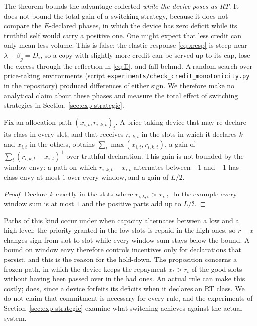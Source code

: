 The theorem bounds the advantage collected \emph{while the device poses as RT}.
It does not bound the total gain of a switching strategy, because it does not compare the $E$-declared phases, in which the device has zero deficit while its truthful self would carry a positive one.
One might expect that less credit can only mean less volume.
This is false: the elastic response \eqref{eq:xresp} is steep near $\lambda-\beta_g=D_i$, so a copy with slightly more credit can be served up to its cap, lose the excess through the reflection in \eqref{eq:D}, and fall behind.
A random search over price-taking environments (script \texttt{experiments/check\_credit\_monotonicity.py} in the repository) produced differences of either sign.
We therefore make no analytical claim about these phases and measure the total effect of switching strategies in Section~\ref{sec:exp-strategic}.

\begin{proposition}\label{prop:commit}
Fix an allocation path $(x_{i,t},r_{i,k,t})_t$.
A price-taking device that may re-declare its class in every slot, and that receives $r_{i,k,t}$ in the slots in which it declares $k$ and $x_{i,t}$ in the others, obtains $\sum_t\max(x_{i,t},r_{i,k,t})$, a gain of $\sum_t(r_{i,k,t}-x_{i,t})^{+}$ over truthful declaration.
This gain is not bounded by the window envy: a path on which $r_{i,k,t}-x_{i,t}$ alternates between $+1$ and $-1$ has class envy at most $1$ over every window, and a gain of $L/2$.
\end{proposition}
\begin{proof}
Declare $k$ exactly in the slots where $r_{i,k,t}>x_{i,t}$. In the example every window sum is at most $1$ and the positive parts add up to $L/2$.
\end{proof}

Paths of this kind occur under \repay{} when capacity alternates between a low and a high level: the priority granted in the low slots is repaid in the high ones, so $r-x$ changes sign from slot to slot while every window sum stays below the bound.
A bound on window envy therefore controls incentives only for declarations that persist, and this is the reason for the hold-down.
The proposition concerns a frozen path, in which the device keeps the repayment $x_t>r_t$ of the good slots without having been passed over in the bad ones.
An actual rule can make this costly; \repay{} does, since a device forfeits its deficits when it declares an RT class.
We do not claim that commitment is necessary for every rule, and the experiments of Section~\ref{sec:exp-strategic} examine what switching achieves against the actual system.

